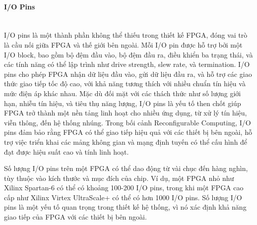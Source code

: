 \documentclass[a4paper]{article}
\begin{document}
\paragraph{I/O Pins} \leavevmode\\
I/O pins là một thành phần không thể thiếu trong thiết kế FPGA, đóng vai trò là cầu nối giữa FPGA và thế giới bên ngoài. Mỗi I/O pin được hỗ trợ bởi một I/O block, bao gồm bộ đệm đầu vào, bộ đệm đầu ra, điều khiển ba trạng thái, và các tính năng có thể lập trình như drive strength, slew rate, và termination. I/O pins cho phép FPGA nhận dữ liệu đầu vào, gửi dữ liệu đầu ra, và hỗ trợ các giao thức giao tiếp tốc độ cao, với khả năng tương thích với nhiều chuẩn tín hiệu và mức điện áp khác nhau. Mặc dù đối mặt với các thách thức như số lượng giới hạn, nhiễu tín hiệu, và tiêu thụ năng lượng, I/O pins là yếu tố then chốt giúp FPGA trở thành một nền tảng linh hoạt cho nhiều ứng dụng, từ xử lý tín hiệu, viễn thông, đến hệ thống nhúng. Trong bối cảnh Reconfigurable Computing, I/O pins đảm bảo rằng FPGA có thể giao tiếp hiệu quả với các thiết bị bên ngoài, hỗ trợ việc triển khai các mảng không gian và mạng định tuyến có thể cấu hình để đạt được hiệu suất cao và tính linh hoạt.

Số lượng I/O pins trên một FPGA có thể dao động từ vài chục đến hàng nghìn, tùy thuộc vào kích thước và mục đích của chip. Ví dụ, một FPGA nhỏ như Xilinx Spartan-6 có thể có khoảng 100-200 I/O pins, trong khi một FPGA cao cấp như Xilinx Virtex UltraScale+ có thể có hơn 1000 I/O pins. Số lượng I/O pins là một yếu tố quan trọng trong thiết kế hệ thống, vì nó xác định khả năng giao tiếp của FPGA với các thiết bị bên ngoài.
\end{document}
